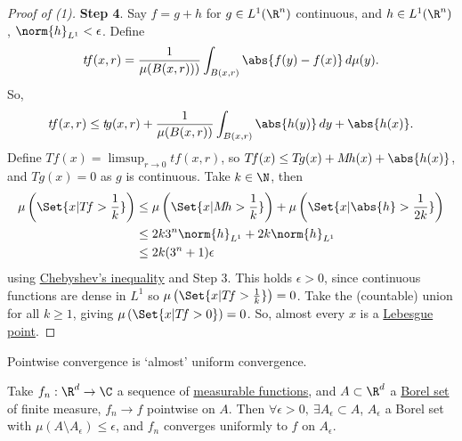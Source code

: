 \documentclass[twoside]{article}
\begin{document}
\begin{proof}[Proof of (1)]
    \textbf{Step 4}.
    Say $f = g+h$ for $g \in L^1(\R^n)$ continuous, and $h \in L^1(\R^n)$, $\norm{h}_{L^1} < \epsilon$.
    Define
    \begin{equation*}
        t\!f(x, r) = \frac{1}{\mu(B(x, r)))} \int_{B(x, r)} \abs{f(y) - f(x)} \, d \mu(y).
    \end{equation*}
    So,
    \begin{equation*}
        t\!f(x, r) \leq t \! g(x, r) + \frac{1}{\mu(B(x, r))} \int_{B(x, r)} \abs{h(y)} \, dy + \abs{h(x)}.
    \end{equation*}
    Define $T \! f (x) = \limsup_{r \to 0} t \! f(x, r)$, so $T\! f(x) \leq T \! g(x) + M \! h(x) + \abs{h(x)}$, and $T\!g(x)  = 0$ as $g$ is continuous.
    Take $k \in \N$, then
    \begin{align*}
        \mu\left(\Set{x | T \! f > \frac{1}{k}}\right) &\leq \mu\left(\Set{x | M \! h > \frac{1}{k}}\right) + \mu\left(\Set{x | \abs{h} > \frac{1}{2k}}\right) \\
                                            &\leq 2k 3^n \norm{h}_{L^1} + 2k \norm{h}_{L^1} \\
                                            &\leq 2k (3^n+1) \epsilon
    \end{align*}
    using \hyperlink{def:chebyshev}{Chebyshev's inequality} and Step 3.
    This holds $\epsilon > 0$, since continuous functions are dense in $L^1$ so $\mu\left(\Set{x | T \! f > \frac{1}{k}}\right) = 0$.
    Take the (countable) union for all $k\geq 1$, giving $\mu\left(\Set{x | T\! f > 0}\right) = 0$.
    So, almost every $x$ is a \hyperlink{def:lebPoint}{Lebesgue point}.
\end{proof}
\color{black}
Pointwise convergence is `almost' uniform convergence.
\begin{thm}\label{thm:egorov}
    Take $f_n: \R^d \to \C$ a sequence of \hyperlink{def:measFunc}{measurable functions}, and $A \subset \R^d$ a \hyperlink{def:borelSet}{Borel set} of finite measure, $f_n \to f$ pointwise on $A$.
    Then $\forall \epsilon > 0, \ \exists A_\epsilon \subset A$, $A_\epsilon$ a Borel set with $\mu(A \setminus A_\epsilon) \leq \epsilon$, and $f_n$ converges uniformly to $f$ on $A_\epsilon$.
\end{thm}
\end{document}
